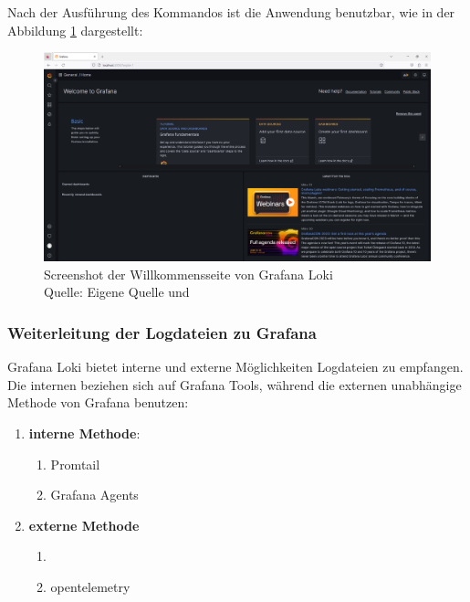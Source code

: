 \newpage
{}
\thispagestyle{lscape}
\begin{landscape}
   Nach der Ausführung des Kommandos ist die Anwendung benutzbar, wie in der Abbildung \ref{fig:grafana_welcome} dargestellt:
    \begin{figure}[H]
        \centerline{\includegraphics[width=1.5\textwidth]{assets/Installation_Grafana.png}}
        \caption[Screenshot der Willkommensseite von Grafana Loki]
        {Screenshot der Willkommensseite von Grafana Loki\\Quelle: Eigene Quelle und \citep{Grafana_Logs}}
        \label{fig:grafana_welcome}
        \centering
    \end{figure}
\end{landscape}
\restoregeometry

\subsubsection{Weiterleitung der Logdateien zu Grafana}
Grafana Loki bietet interne und externe Möglichkeiten Logdateien zu empfangen. Die internen beziehen sich auf Grafana Tools, während die externen unabhängige Methode von Grafana benutzen:

\begin{enumerate}[noitemsep]
   \item \textbf{interne Methode}:
   \begin{enumerate}[noitemsep]
      \item Promtail
      \item Grafana Agents
   \end{enumerate}
   \item \textbf{externe Methode}
   \begin{enumerate}[noitemsep]
      \item {}
      \item \gls{opentelemetry}
   \end{enumerate}
\end{enumerate}

